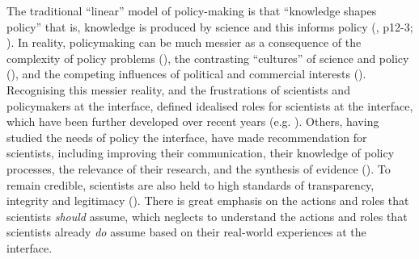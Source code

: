 The traditional ``linear'' model of policy-making is that ``knowledge shapes policy'' that is, knowledge is produced by science and this informs policy (\cite{Pielke2007}, p12-3; \cite{BoswellS2017}). In reality, policymaking can be much messier as a consequence of the complexity of policy problems (\cite{Cairney2016}), the contrasting ``cultures'' of science and policy (\cite{Dale2002,Obermeister2022}), and the competing influences of political and commercial interests (\cite{StoddardEtAl2021}). Recognising this messier reality, and the frustrations of scientists and policymakers at the interface, \textcite{Pielke2007} defined idealised roles for scientists at the interface, which have been further developed over recent years (e.g. \cite{RapleyD2014,GregoryBW2024}). Others, having studied the needs of policy the interface, have made recommendation for scientists, including improving their communication, their knowledge of policy processes, the relevance of their research, and the synthesis of evidence (\cite{KennyRHTB2017,LubchencoR2020,GluckmanBK2021,Bisbal2024}). To remain credible, scientists are also held to high standards of transparency, integrity and legitimacy (\cite{KennyRHTB2017,ColognaKMBMO2024,GregoryBW2024}). There is great emphasis on the actions and roles that scientists \emph{should} assume, which neglects to understand the actions and roles that scientists already \emph{do} assume based on their real-world experiences at the interface.

